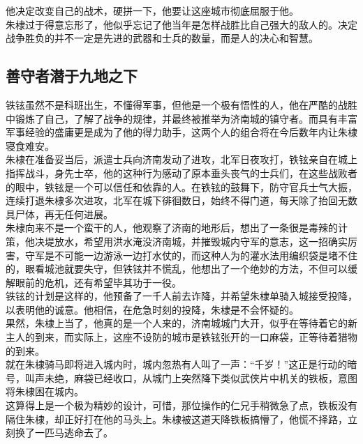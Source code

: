 \begin{multicols}{\theparacolNo}
他决定改变自己的战术，硬拼一下，他要让这座城市彻底屈服于他。\\

朱棣过于得意忘形了，他似乎忘记了他当年是怎样战胜比自己强大的敌人的。决定战争胜负的并不一定是先进的武器和士兵的数量，而是人的决心和智慧。\\

\subsection{善守者潜于九地之下}
铁铉虽然不是科班出生，不懂得军事，但他是一个极有悟性的人，他在严酷的战胜中锻炼了自己，了解了战争的规律，并最终被推举为济南城的镇守者。而具有丰富军事经验的盛庸更是成为了他的得力助手，这两个人的组合将在今后数年内让朱棣寝食难安。\\

朱棣在准备妥当后，派遣士兵向济南发动了进攻，北军日夜攻打，铁铉亲自在城上指挥战斗，身先士卒，他的这种行为感动了原本垂头丧气的士兵们，在这些战败者的眼中，铁铉是一个可以信任和依靠的人。在铁铉的鼓舞下，防守官兵士气大振，连续打退朱棣多次进攻，北军在城下徘徊数日，始终不得门道，每天除了抬回无数具尸体，再无任何进展。\\

朱棣向来不是一个蛮干的人，他观察了济南的地形后，想出了一条很是毒辣的计策，他决堤放水，希望用洪水淹没济南城，并摧毁城内守军的意志，这一招确实厉害，守军是不可能一边游泳一边打水仗的，而这种人为的灌水法用编织袋是堵不住的，眼看城池就要失守，但铁铉并不慌乱，他想出了一个绝妙的方法，不但可以缓解眼前的危机，还有希望毕其功于一役。\\

铁铉的计划是这样的，他预备了一千人前去诈降，并希望朱棣单骑入城接受投降，以表明他的诚意。他相信，在危急时刻的投降，朱棣是不会怀疑的。\\

果然，朱棣上当了，他真的是一个人来的，济南城城门大开，似乎在等待着它的新主人的到来，而实际上，这座不设防的城市是铁铉张开的一口麻袋，正等待着猎物的到来。\\

就在朱棣骑马即将进入城内时，城内忽热有人叫了一声：“千岁！”这正是行动的暗号，叫声未绝，麻袋已经收口，从城门上突然降下类似武侠片中机关的铁板，意图将朱棣困在城内。\\

这算得上是一个极为精妙的设计，可惜，那位操作的仁兄手稍微急了点，铁板没有隔住朱棣，却正好打在他的马头上。朱棣被这道天降铁板搞懵了，他慌不择路，立刻换了一匹马逃命去了。\\


\end{multicols}

